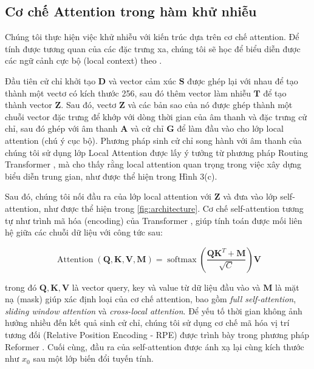 \subsection{Cơ chế Attention trong hàm khử nhiễu}

Chúng tôi thực hiện việc khử nhiễu với kiến trúc dựa trên cơ chế attention. Để tính được tương quan của các đặc trưng xa, chúng tôi sẽ học để biểu diễn được các ngữ cảnh cực bộ (local context) theo \cite{rae2020transformers}.

Đầu tiên cử chỉ khởi tạo $\mathbf{D}$ và vector cảm xúc $\mathbf{S}$ được ghép lại với nhau để tạo thành một vectơ có kích thước 256, sau đó thêm vector làm nhiễu $\mathbf{T}$ để tạo thành vector $\mathbf{Z}$. 
Sau đó, vectơ $\mathbf{Z}$ và các bản sao của nó được ghép thành một chuỗi vector đặc trưng để khớp với dòng thời gian của âm thanh và đặc trưng cử chỉ, sau đó ghép với âm thanh $\mathbf{A}$ và cử chỉ $\mathbf{G}$ để làm đầu vào cho lớp local attention (chú ý cục bộ). 
Phương pháp sinh cử chỉ song hành với âm thanh của chúng tôi sử dụng lớp Local Attention được lấy ý tưởng từ phương pháp Routing Transformer \cite{roy2021efficient}, mà cho thấy rằng local attention quan trọng trong việc xây dựng biểu diễn trung gian, như được thể hiện trong Hình 3(c).

Sau đó, chúng tôi nối đầu ra của lớp local attention với $\mathbf{Z}$ và đưa vào lớp self-attention, như được thể hiện trong \autoref{fig:architecture}. Cơ chế self-attention tương tự như trình mã hóa (encoding) của Transformer \cite{vaswani2017attention}, giúp tính toán được mối liên hệ giữa các chuỗi dữ liệu với công tức sau:


\begin{equation} \label{eq:attention}
\operatorname{Attention}(\mathbf{Q}, \mathbf{K}, \mathbf{V}, \mathbf{M})=\operatorname{softmax}\left(\frac{\mathbf{Q} \mathbf{K}^{T}+\mathbf{M}}{\sqrt{C}}\right) \mathbf{V}
\end{equation}

trong đó $\mathbf{Q}, \mathbf{K}, \mathbf{V}$ là vector query, key và value từ dữ liệu đầu vào và $\mathbf{M}$ là mặt nạ (mask) giúp xác định loại của cơ chế attention, bao gồm \textit{full self-attention}, \textit{sliding window attention} và \textit{cross-local attention}. Để yếu tố thời gian không ảnh hưởng nhiều đến kết quả sinh cử chỉ, chúng tôi sử dụng cơ chế mã hóa vị trí tương đối (Relative Position Encoding - RPE) được trình bày trong phương pháp Reformer \cite{kitaev2020reformer}. Cuối cùng, đầu ra của self-attention được ánh xạ lại cùng kích thước như $x_{0}$ sau một lớp biến đổi tuyến tính.

